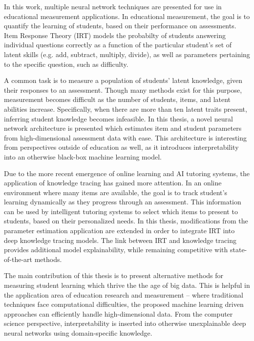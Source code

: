 In this work, multiple neural network techniques are presented for use in educational measurement applications. In educational measurement, the goal is to quantify the learning of students, based on their performance on assessments. Item Response Theory (IRT) models the probabilty of students answering individual questions correctly as a function of the particular student's set of latent skills (e.g. add, subtract, multiply, divide), as well as parameters pertaining to the specific question, such as difficulty.

A common task is to measure a population of students' latent knowledge, given their responses to an assessment. Though many methods exist for this purpose, measurement becomes difficult as the number of students, items, and latent abilities increase. Specifically, when there are more than ten latent traits present, inferring student knowledge becomes infeasible. In this thesis, a novel neural network architecture is presented which estimates item and student parameters from high-dimensional assessment data with ease. This architecture is interesting from perspectives outside of education as well, as it introduces interpretability into an otherwise black-box machine learning model.

Due to the more recent emergence of online learning and AI tutoring systems, the application of knowledge tracing has gained more attention. In an online environment where many items are available, the goal is to track student's learning dynamically as they progress through an assessment. This information can be used by intelligent tutoring systems to select which items to present to students, based on their personalized needs. In this thesis, modifications from the parameter estimation application are extended in order to integrate IRT into deep knowledge tracing models. The link between IRT and knowledge tracing provides additional model explainability, while remaining competitive with state-of-the-art methods.

The main contribution of this thesis is to present alternative methods for measuring student learning which thrive the the age of big data. This is helpful in the application area of education research and measurement -- where traditional techniques face computational difficulties, the proposed machine learning driven approaches can efficiently handle high-dimensional data. From the computer science perspective, interpretability is inserted into otherwise unexplainable deep neural networks using domain-specific knowledge.
